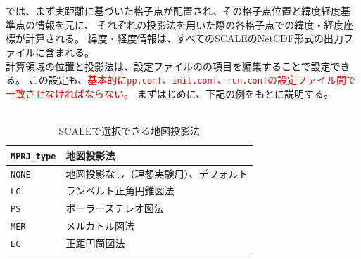 \section{\SecMapprojectionSetting} \label{subsec:adv_mapproj}
\scalerm では、まず実距離に基づいた格子点が配置され、その格子点位置と緯度経度基準点の情報を元に、
それぞれの投影法を用いた際の各格子点での緯度・経度座標が計算される。
緯度・経度情報は、すべてのSCALEのNetCDF形式の出力ファイルに含まれる。\\
計算領域の位置と投影法は、設定ファイルのの項目を編集することで設定できる。
この設定も、\textcolor{red}{基本的に\texttt{pp.conf}、\texttt{init.conf}、\texttt{run.conf}の設定ファイル間で一致させなければならない。}
まずはじめに、下記の例をもとに説明する。\\

\\

\begin{table}[b]
\begin{center}
\caption{SCALEで選択できる地図投影法}
\begin{tabularx}{150mm}{|l|X|} \hline
 \rowcolor[gray]{0.9} \verb|MPRJ_type| & 地図投影法 \\ \hline
 \verb|NONE| & 地図投影なし（理想実験用）、デフォルト \\ \hline
 \verb|LC|   & ランベルト正角円錐図法              \\ \hline
 \verb|PS|   & ポーラーステレオ図法                \\ \hline
 \verb|MER|  & メルカトル図法                     \\ \hline
 \verb|EC|   & 正距円筒図法                       \\ \hline
\end{tabularx}
\label{tab:map_proj}
\end{center}
\end{table}


